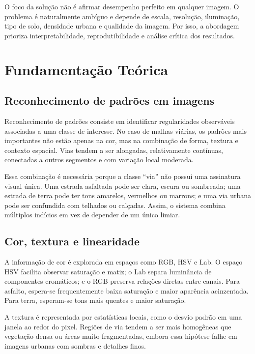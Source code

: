 \documentclass[12pt,a4paper]{article}
\begin{document}
O foco da solução não é afirmar desempenho perfeito em qualquer imagem. O problema é naturalmente ambíguo e depende de escala, resolução, iluminação, tipo de solo, densidade urbana e qualidade da imagem. Por isso, a abordagem prioriza interpretabilidade, reprodutibilidade e análise crítica dos resultados.

\section{Fundamentação Teórica}

\subsection{Reconhecimento de padrões em imagens}

Reconhecimento de padrões consiste em identificar regularidades observáveis associadas a uma classe de interesse. No caso de malhas viárias, os padrões mais importantes não estão apenas na cor, mas na combinação de forma, textura e contexto espacial. Vias tendem a ser alongadas, relativamente contínuas, conectadas a outros segmentos e com variação local moderada.

Essa combinação é necessária porque a classe ``via'' não possui uma assinatura visual única. Uma estrada asfaltada pode ser clara, escura ou sombreada; uma estrada de terra pode ter tons amarelos, vermelhos ou marrons; e uma via urbana pode ser confundida com telhados ou calçadas. Assim, o sistema combina múltiplos indícios em vez de depender de um único limiar.

\subsection{Cor, textura e linearidade}

A informação de cor é explorada em espaços como RGB, HSV e Lab. O espaço HSV facilita observar saturação e matiz; o Lab separa luminância de componentes cromáticos; e o RGB preserva relações diretas entre canais. Para asfalto, espera-se frequentemente baixa saturação e maior aparência acinzentada. Para terra, esperam-se tons mais quentes e maior saturação.

A textura é representada por estatísticas locais, como o desvio padrão em uma janela ao redor do pixel. Regiões de via tendem a ser mais homogêneas que vegetação densa ou áreas muito fragmentadas, embora essa hipótese falhe em imagens urbanas com sombras e detalhes finos.
\end{document}
